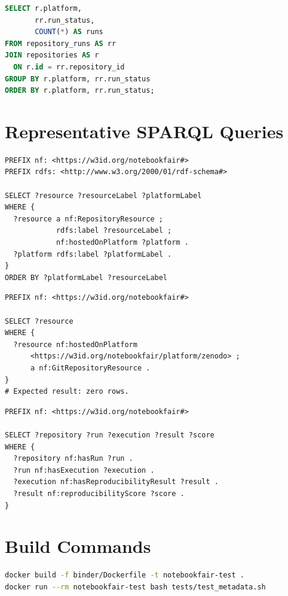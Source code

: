 \begin{lstlisting}[language=SQL,caption={Inspect repository run outcomes.}]
SELECT r.platform,
       rr.run_status,
       COUNT(*) AS runs
FROM repository_runs AS rr
JOIN repositories AS r
  ON r.id = rr.repository_id
GROUP BY r.platform, rr.run_status
ORDER BY r.platform, rr.run_status;
\end{lstlisting}

\section{Representative SPARQL Queries}

\begin{lstlisting}[caption={List resources and platforms.}]
PREFIX nf: <https://w3id.org/notebookfair#>
PREFIX rdfs: <http://www.w3.org/2000/01/rdf-schema#>

SELECT ?resource ?resourceLabel ?platformLabel
WHERE {
  ?resource a nf:RepositoryResource ;
            rdfs:label ?resourceLabel ;
            nf:hostedOnPlatform ?platform .
  ?platform rdfs:label ?platformLabel .
}
ORDER BY ?platformLabel ?resourceLabel
\end{lstlisting}

\begin{lstlisting}[caption={Constraint check for Zenodo typing.}]
PREFIX nf: <https://w3id.org/notebookfair#>

SELECT ?resource
WHERE {
  ?resource nf:hostedOnPlatform
      <https://w3id.org/notebookfair/platform/zenodo> ;
      a nf:GitRepositoryResource .
}
# Expected result: zero rows.
\end{lstlisting}

\begin{lstlisting}[caption={Trace an execution to a result.}]
PREFIX nf: <https://w3id.org/notebookfair#>

SELECT ?repository ?run ?execution ?result ?score
WHERE {
  ?repository nf:hasRun ?run .
  ?run nf:hasExecution ?execution .
  ?execution nf:hasReproducibilityResult ?result .
  ?result nf:reproducibilityScore ?score .
}
\end{lstlisting}

\section{Build Commands}

\begin{lstlisting}[language=bash,caption={Metadata test in the local container image.}]
docker build -f binder/Dockerfile -t notebookfair-test .
docker run --rm notebookfair-test bash tests/test_metadata.sh
\end{lstlisting}

